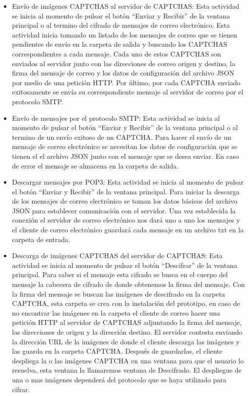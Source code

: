 \documentclass[12pt,oneside,onecolumn,openany]{report}
\begin{document}
\begin{itemize}
 \item Envío de imágenes CAPTCHAS al servidor de CAPTCHAS: Esta actividad se inicia al momento de pulsar el botón “Enviar y Recibir” de la ventana principal o al termino del cifrado de mensajes de correo electrónico.
Esta actividad inicia tomando un listado de los mensajes de correo que se tienen pendientes de envío en la carpeta de salida y buscando los CAPTCHAS correspondientes a cada mensaje. Cada uno de estos CAPTCHAS son enviados al servidor junto con las direcciones de correo origen y destino, la firma del mensaje de correo y los datos de configuración del archivo JSON por medio de una petición HTTP. Por último, por cada CAPTCHA enviado exitosamente se envía su correspondiente mensaje al servidor de correo por el protocolo SMTP.
 \item Envío de mensajes por el protocolo SMTP: Esta actividad se inicia al momento de pulsar el botón “Enviar y Recibir” de la ventana principal o al termino de un envío exitoso de un CAPTCHA.
Para hacer el envío de un mensaje de correo electrónico se necesitan los datos de configuración que se tienen el el archivo JSON junto con el mensaje que se desea enviar. En caso de error el mensaje se almacena en la carpeta de salida.
 \item Descargar mensajes por POP3: Esta actividad se inicia al momento de pulsar el botón “Enviar y Recibir” de la ventana principal.
Para iniciar la descarga de los mensajes de correo electrónico se toman los datos básicos del archivo JSON para establecer comunicación con el servidor. Una vez establecida la conexión el servidor de correo electrónico nos dará uno a uno los mensajes y el cliente de correo electrónico guardará cada mensaje en un archivo txt en la carpeta de entrada.
 \item Descarga de imágenes CAPTCHAS del servidor de CAPTCHAS: Esta actividad se inicia al momento de pulsar el botón “Descifrar” de la ventana principal.
Para saber si el mensaje esta cifrado se busca en el cuerpo del mensaje la cabecera de cifrado de donde obtenemos la firma del mensaje. Con la firma del mensaje se buscan las imágenes de descifrado en la carpeta CAPTCHA, esta carpeta se crea con la instalación del prototipo, en caso de no encontrar las imágenes en la carpeta el cliente de correo hacer una petición HTTP al servidor de CAPTCHAS adjuntando la firma del mensaje, las direcciones de origen y la dirección destino.
El servidor contesta enviando la dirección URL de la imágenes de  donde  el cliente descarga las imágenes y las guarda en la carpeta CAPTCHA. Después de guardarlas, el cliente despliega la o las imágenes CAPTCHA en una ventana para que el usuario lo resuelva, esta ventana la llamaremos ventana de Descifrado. El despliegue de una o mas imágenes dependerá del protocolo que se haya utilizado para cifrar.

\end{itemize}
\end{document}
